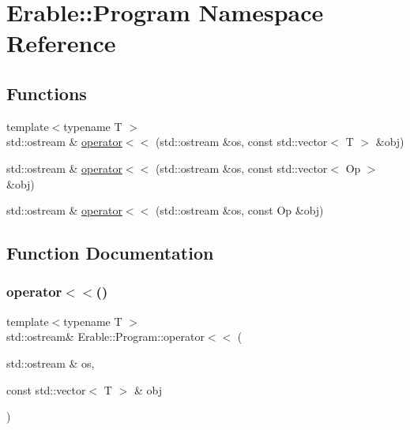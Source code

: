 \hypertarget{namespace_erable_1_1_program}{}\section{Erable\+::Program Namespace Reference}
\label{namespace_erable_1_1_program}
\subsection*{Functions}
\begin{DoxyCompactItemize}
\item 
{\footnotesize template$<$typename T $>$ }\\std\+::ostream \& \mbox{\hyperlink{namespace_erable_1_1_program_ab1bd4246da301c287a9f9dfbe414b0e4}{operator$<$$<$}} (std\+::ostream \&os, const std\+::vector$<$ T $>$ \&obj)
\item 
std\+::ostream \& \mbox{\hyperlink{namespace_erable_1_1_program_aad85b78064a3b7131195533b32457c33}{operator$<$$<$}} (std\+::ostream \&os, const std\+::vector$<$ Op $>$ \&obj)
\item 
std\+::ostream \& \mbox{\hyperlink{namespace_erable_1_1_program_a502e6950d7c128219314cce6a7849dfa}{operator$<$$<$}} (std\+::ostream \&os, const Op \&obj)
\end{DoxyCompactItemize}


\subsection{Function Documentation}
\mbox{\label{namespace_erable_1_1_program_ab1bd4246da301c287a9f9dfbe414b0e4}} 
\subsubsection{\texorpdfstring{operator$<$$<$()}{operator<<()}\hspace{0.1cm}{\footnotesize\ttfamily [1/3]}}
{\footnotesize\ttfamily template$<$typename T $>$ \\
std\+::ostream\& Erable\+::\+Program\+::operator$<$$<$ (\begin{DoxyParamCaption}\item[{std\+::ostream \&}]{os,  }\item[{const std\+::vector$<$ T $>$ \&}]{obj }\end{DoxyParamCaption})}


